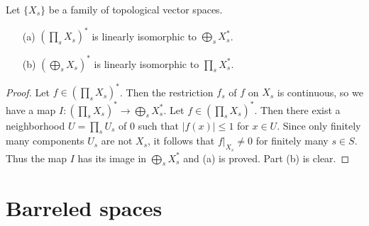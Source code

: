 \begin{proposition}\label{dual space of product and direct sum}
Let $\{X_s\}$ be a family of topological vector spaces.
\begin{itemize}
\item[(a)] $(\prod_sX_s)^*$ is linearly isomorphic to $\bigoplus_sX_s^*$.
\item[(b)] $(\bigoplus_sX_s)^*$ is linearly isomorphic to $\prod_sX_s^*$.
\end{itemize}
\end{proposition}
\begin{proof}
Let $f\in(\prod_sX_s)^*$. Then the restriction $f_s$ of $f$ on $X_s$ is continuous, so we have a map $I:(\prod_sX_s)^*\to\bigoplus_sX_s^*$. Let $f\in(\prod_sX_s)^*$. Then there exist a neighborhood $U=\prod_sU_s$ of $0$ such that $|f(x)|\leq 1$ for $x\in U$. Since only finitely many components $U_s$ are not $X_s$, it follows that $f|_{X_s}\neq 0$ for finitely many $s\in S$. Thus the map $I$ has its image in $\bigoplus_sX_s^*$ and (a) is proved. Part (b) is clear.
\end{proof}
\chapter{Barreled spaces}
